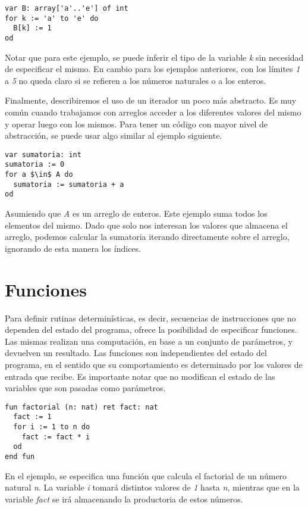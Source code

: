 \documentclass{article}
\begin{document}
\begin{lstlisting}
var B: array['a'..'e'] of int
for k := 'a' to 'e' do
  B[k] := 1
od
\end{lstlisting}

Notar que para este ejemplo, se puede inferir el tipo de la variable \textit{k} sin necesidad de especificar el mismo.
En cambio para los ejemplos anteriores, con los límites \textit{1} a \textit{5} no queda claro si se refieren a los números naturales o a los enteros.

Finalmente, describiremos el uso de un iterador un poco más abstracto.
Es muy común cuando trabajamos con arreglos acceder a los diferentes valores del mismo y operar luego con los mismos.
Para tener un código con mayor nivel de abstracción, se puede usar algo similar al ejemplo siguiente.

\begin{lstlisting}
var sumatoria: int
sumatoria := 0
for a $\in$ A do
  sumatoria := sumatoria + a
od
\end{lstlisting}

Asumiendo que \textit{A} es un arreglo de enteros.
Este ejemplo suma todos los elementos del mismo.
Dado que solo nos interesan los valores que almacena el arreglo, podemos calcular la sumatoria iterando directamente sobre el arreglo, ignorando de esta manera los índices.

\section{Funciones}

Para definir rutinas determinísticas, es decir, secuencias de instrucciones que no dependen del estado del programa, \Lang\space ofrece la posibilidad de especificar funciones.
Las mismas realizan una computación, en base a un conjunto de parámetros, y devuelven un resultado.
Las funciones son independientes del estado del programa, en el sentido que su comportamiento es determinado por los valores de entrada que recibe.
Es importante notar que no modifican el estado de las variables que son pasadas como parámetros.

\begin{lstlisting}
fun factorial (n: nat) ret fact: nat
  fact := 1
  for i := 1 to n do
    fact := fact * i
  od
end fun
\end{lstlisting}

En el ejemplo, se especifica una función que calcula el factorial de un número natural \textit{n}.
La variable \textit{i} tomará distintos valores de \textit{1} hasta \textit{n}, mientras que en la variable \textit{fact} se irá almacenando la productoria de estos números.
\end{document}
